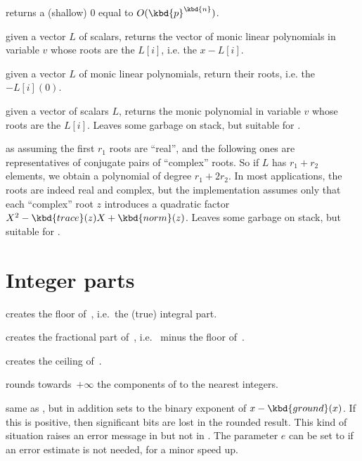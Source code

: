  returns a (shallow) $0$
 equal to $O(\kbd{p}^\kbd{n})$.


 given a vector $L$ of scalars,
returns the vector of monic linear polynomials in variable $v$ whose roots
are the $L[i]$, i.e. the $x - L[i]$.

 given a vector $L$ of monic linear
polynomials, return their roots, i.e. the $- L[i](0)$.

 given a vector of scalars $L$,
returns the monic polynomial in variable $v$ whose roots are the $L[i]$.
Leaves some garbage on stack, but suitable for .

 as 
assuming the first $r_1$ roots are ``real'', and the following ones are
representatives of conjugate pairs of ``complex'' roots. So if $L$ has $r_1 +
r_2$ elements, we obtain a polynomial of degree $r_1 + 2r_2$. In most
applications, the roots are indeed real and complex, but the implementation
assumes only that each ``complex'' root $z$ introduces a quadratic
factor $X^2 - \kbd{trace}(z) X + \kbd{norm}(z)$.
Leaves some garbage on stack, but suitable for .

\section{Integer parts}

 creates the floor of~, i.e.\ the (true)
integral part.

 creates the fractional part of~, i.e.\ 
minus the floor of~.

 creates the ceiling of~.

 rounds towards~$+\infty$ the components of 
to the nearest integers.

 same as , but in addition sets
 to the binary exponent of $x - \kbd{ground}(x)$. If this is
positive, then significant bits are lost in the rounded result. This kind of
situation raises an error message in  but not in .
The parameter $e$ can be set to  if an error estimate is not
needed, for a minor speed up.

